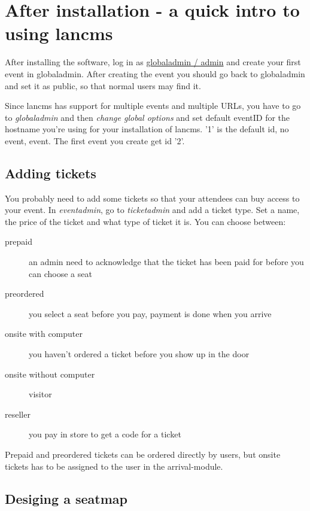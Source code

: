 \chapter{After installation - a quick intro to using lancms}

After installing the software, log in as \underline{globaladmin / admin} and
create your first event in globaladmin. After creating the event you should go
back to globaladmin and set it as public, so that normal users may find it.

Since lancms has support for multiple events and multiple URLs, you have to go
to \textit{globaladmin} and then \textit{change global options} and set default eventID
for the hostname you're using for your installation of lancms.
'1' is the default id, no event, event. The first event you create get id '2'.

\section{Adding tickets}

You probably need to add some tickets so that your attendees can buy access to
your event. In \textit{eventadmin}, go to \textit{ticketadmin} and add a
ticket type. Set a name, the price of the ticket and what type of ticket it
is. You can choose between:
\begin{description}
\item[prepaid] an admin need to acknowledge that the ticket has been paid
for before you can choose a seat
\item[preordered] you select a seat before you pay, payment is done when you
arrive
\item[onsite with computer] you haven't ordered a ticket before you show up
in the door
\item[onsite without computer] visitor
\item[reseller] you pay in store to get a code for a ticket
\end{description}

Prepaid and preordered tickets can be ordered directly by users, but onsite
tickets has to be assigned to the user in the arrival-module.

\section{Desiging a seatmap}

